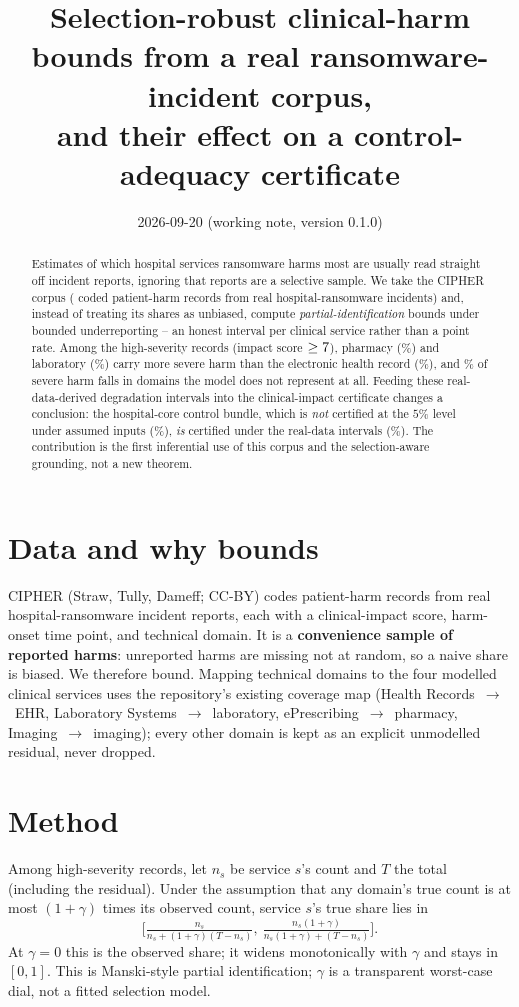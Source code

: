 \documentclass[11pt]{article}
\title{Selection-robust clinical-harm bounds from a real ransomware-incident corpus,\\
and their effect on a control-adequacy certificate}
\author{}
\date{2026-09-20 (working note, version 0.1.0)}
\begin{document}
\maketitle

\begin{abstract}
Estimates of which hospital services ransomware harms most are usually read
straight off incident reports, ignoring that reports are a selective sample. We
take the CIPHER corpus (\CipherRecords{} coded patient-harm records from real
hospital-ransomware incidents) and, instead of treating its shares as unbiased,
compute \emph{partial-identification} bounds under bounded underreporting -- an
honest interval per clinical service rather than a point rate. Among the
\CipherHighTotal{} high-severity records (impact score $\ge 7{}$),
pharmacy (\CipherPharmaShare\%) and laboratory (\CipherLabShare\%) carry more
severe harm than the electronic health record (\CipherEhrShare\%), and
\CipherResidualShare\% of severe harm falls in domains the model does not
represent at all. Feeding these real-data-derived degradation intervals into the
clinical-impact certificate changes a conclusion: the hospital-core control bundle,
which is \emph{not} certified at the $5\%$ level under assumed inputs
(\CipherCoreAssumedPct\%), \emph{is} certified under the real-data intervals
(\CipherCoreRealPct\%). The contribution is the first inferential use of this
corpus and the selection-aware grounding, not a new theorem.
\end{abstract}

\section{Data and why bounds}
CIPHER (Straw, Tully, Dameff; CC-BY) codes patient-harm records from real
hospital-ransomware incident reports, each with a clinical-impact score, harm-onset
time point, and technical domain. It is a \textbf{convenience sample of reported
harms}: unreported harms are missing not at random, so a naive share is biased. We
therefore bound. Mapping technical domains to the four modelled clinical services
uses the repository's existing coverage map (Health Records~$\to$~EHR, Laboratory
Systems~$\to$~laboratory, ePrescribing~$\to$~pharmacy, Imaging~$\to$~imaging);
every other domain is kept as an explicit unmodelled residual, never dropped.

\section{Method}
Among high-severity records, let $n_s$ be service $s$'s count and $T$ the total
(including the residual). Under the assumption that any domain's true count is at
most $(1+\gamma)$ times its observed count, service $s$'s true share lies in
\[
\Big[\tfrac{n_s}{n_s+(1+\gamma)(T-n_s)},\ \tfrac{n_s(1+\gamma)}{n_s(1+\gamma)+(T-n_s)}\Big].
\]
At $\gamma=0$ this is the observed share; it widens monotonically with $\gamma$ and
stays in $[0,1]$. This is Manski-style partial identification; $\gamma$ is a
transparent worst-case dial, not a fitted selection model.
\end{document}
